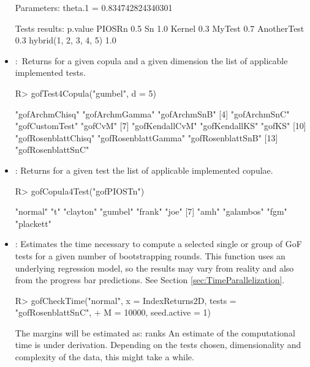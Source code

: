\begin{itemize}
\begin{example}
Parameters:
theta.1 = 0.834742824340301

Tests results:
                      p.value
PIOSRn                    0.5
Sn                        1.0
Kernel                    0.3
MyTest                    0.7
AnotherTest               0.3
hybrid(1, 2, 3, 4, 5)     1.0
\end{example}
\bigskip
    \item {}:~Returns for a given copula and a given dimension the list of applicable implemented tests.
\begin{example}
R> gofTest4Copula("gumbel", d = 5)
\end{example} 
\mycolor
\begin{example}
 [1] "gofArchmChisq"      "gofArchmGamma"      "gofArchmSnB"       
 [4] "gofArchmSnC"        "gofCustomTest"      "gofCvM"            
 [7] "gofKendallCvM"      "gofKendallKS"       "gofKS"             
[10] "gofRosenblattChisq" "gofRosenblattGamma" "gofRosenblattSnB"  
[13] "gofRosenblattSnC" 
\end{example} 
\bk
\bigskip
    \item {}: Returns for a given test the list of applicable implemented copulae.
\begin{example}
R> gofCopula4Test("gofPIOSTn")
\end{example}
\mycolor 
\vspace{-0.15cm}
\begin{example}
 [1] "normal"   "t"        "clayton"  "gumbel"   "frank"    "joe"     
 [7] "amh"      "galambos" "fgm"      "plackett"
\end{example}
\bk \bigskip
\item {}: Estimates the time necessary to compute a selected single or group of GoF tests for a given number of bootstrapping rounds. This function uses an underlying regression model, so the results may vary from reality and also from the progress bar predictions. See Section \ref{sec:TimeParallelization}.
\begin{example}
R> gofCheckTime("normal", x = IndexReturns2D, tests = "gofRosenblattSnC", 
+               M = 10000, seed.active = 1)
\end{example}
\mycolor
\vspace{-0.15cm}
\begin{example}
The margins will be estimated as: ranks
An estimate of the computational time is under derivation.
Depending on the tests chosen, dimensionality and complexity of the data, this 
might take a while.

\end{example}
\end{itemize}
